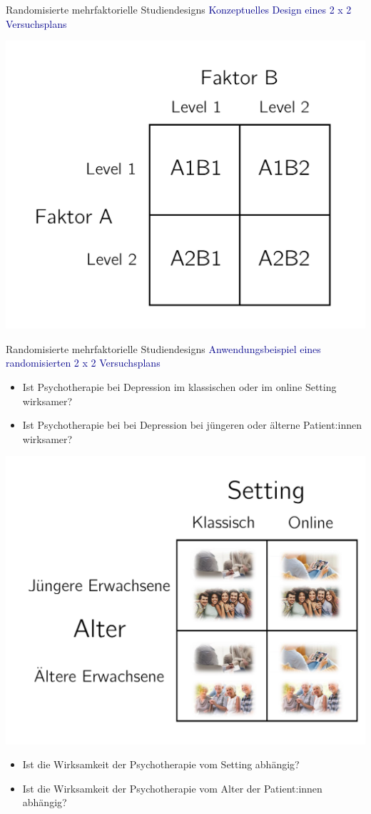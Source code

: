 \documentclass[
  8pt,
  ignorenonframetext,
]{beamer}
\providecommand{\tightlist}{%
  \setlength{\itemsep}{0pt}\setlength{\parskip}{0pt}}
\begin{document}
\begin{frame}{Randomisierte mehrfaktorielle Studiendesigns}
\protect\hypertarget{randomisierte-mehrfaktorielle-studiendesigns-2}{}
\textcolor{darkblue}{Konzeptuelles Design eines 2 x 2 Versuchsplans}

\begin{center}\includegraphics[width=0.65\linewidth]{8_Abbildungen/alm_8_zweifaktorielle_va_nomenklatur} \end{center}
\end{frame}

\begin{frame}{Randomisierte mehrfaktorielle Studiendesigns}
\protect\hypertarget{randomisierte-mehrfaktorielle-studiendesigns-3}{}
\textcolor{darkblue}{Anwendungsbeispiel eines randomisierten 2 x 2 Versuchsplans}
\small {}

\begin{itemize}
\tightlist
\item
  Ist Psychotherapie bei Depression im klassischen oder im online
  Setting wirksamer?
\item
  Ist Psychotherapie bei bei Depression bei jüngeren oder älterne
  Patient:innen wirksamer?
\end{itemize}

\begin{center}\includegraphics[width=0.5\linewidth]{8_Abbildungen/alm_8_zweifaktorielle_va_beispiel} \end{center}

\begin{itemize}
\tightlist
\item
  Ist die Wirksamkeit der Psychotherapie vom Setting abhängig?
\item
  Ist die Wirksamkeit der Psychotherapie vom Alter der Patient:innen
  abhängig?
\end{itemize}
\end{frame}
\end{document}
